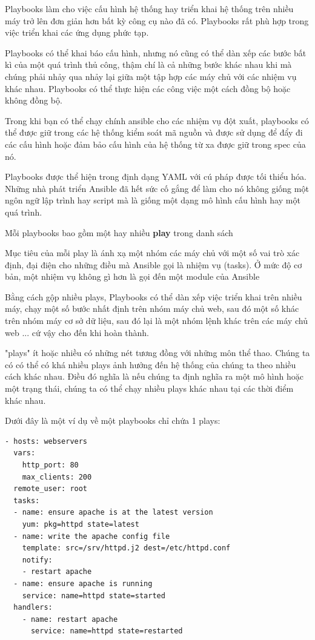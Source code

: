 Playbooks làm cho việc cấu hình hệ thống hay triển khai hệ thống trên nhiều máy trở lên đơn giản hơn bất kỳ công cụ nào đã có. Playbooks rất phù hợp trong việc triển khai các ứng dụng phức tạp.

Playbooks có thể khai báo cấu hình, nhưng nó cũng có thể dàn xếp các bước bất kì của một quá trình thủ công, thậm chí là cả những bước khác nhau khi mà chúng phải nhảy qua nhảy lại giữa một tập hợp các máy chủ với các nhiệm vụ khác nhau. Playbooks có thể thực hiện các công việc một cách đồng bộ hoặc không đồng bộ.

Trong khi bạn có thể chạy chính ansible cho các nhiệm vụ đột xuất, playbooks có thể được giữ trong các hệ thống kiểm soát mã nguồn và được sử dụng để đẩy đi các cấu hình hoặc đảm bảo cấu hình của hệ thống từ xa được giữ trong spec của nó.

Playbooks được thể hiện trong định dạng YAML với cú pháp được tối thiểu hóa. Những nhà phát triển Ansible đã hết sức cố gắng để làm cho nó không giống một ngôn ngữ lập trình hay script mà là giống một dạng mô hình cấu hình hay một quá trình.

Mỗi playbooks bao gồm một hay nhiều \textbf{play} trong danh sách

Mục tiêu của mỗi play là ánh xạ một nhóm các máy chủ với một số vai trò xác định, đại điện cho những điều mà Ansible gọi là nhiệm vụ (tasks). Ở mức độ cơ bản, một nhiệm vụ không gì hơn là gọi đến một module của Ansible

Bằng cách gộp nhiều plays, Playbooks có thể dàn xếp việc triển khai trên nhiều máy, chạy một số bước nhất định trên nhóm máy chủ web, sau đó một số khác trên nhóm máy cơ sở dữ liệu, sau đó lại là một nhóm lệnh khác trên các máy chủ web ... cứ vậy cho đến khi hoàn thành.

"plays" ít hoặc nhiều có những nét tương đồng với những môn thể thao. Chúng ta có có thể có khá nhiều plays ảnh hưởng đến hệ thống của chúng ta theo nhiều cách khác nhau. Điều đó nghĩa là nếu chúng ta định nghĩa ra một mô hình hoặc một trạng thái, chúng ta có thể chạy nhiều plays khác nhau tại các thời điểm khác nhau.

Dưới đây là một ví dụ về một playbooks chỉ chứa 1 plays:

\begin{lstlisting}[label={lst:ansbile_playbook_example},caption={Ví dụ về playbooks của Ansible},morekeywords={hosts, vars, tasks, name, yum, http_port, max_clients, remote_user, template, service, handlers, notify, state, pkg, src, dest}]
- hosts: webservers
  vars:
    http_port: 80
    max_clients: 200
  remote_user: root
  tasks:
  - name: ensure apache is at the latest version
    yum: pkg=httpd state=latest
  - name: write the apache config file
    template: src=/srv/httpd.j2 dest=/etc/httpd.conf
    notify:
    - restart apache
  - name: ensure apache is running
    service: name=httpd state=started
  handlers:
    - name: restart apache
      service: name=httpd state=restarted
\end{lstlisting}

